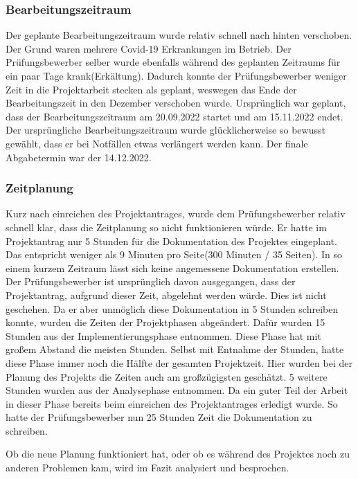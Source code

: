 \subsubsection{Bearbeitungszeitraum}
\label{sec:AbweichungenProjektantrag}
Der geplante Bearbeitungszeitraum wurde relativ schnell nach hinten verschoben. Der Grund waren mehrere Covid-19 Erkrankungen im Betrieb. Der Prüfungsbewerber selber wurde ebenfalls während des geplanten Zeitraums für ein paar Tage krank(Erkältung). Dadurch konnte der Prüfungsbewerber weniger Zeit in die Projektarbeit stecken als geplant, weswegen das Ende der Bearbeitungszeit in den Dezember verschoben wurde. Ursprünglich war geplant, dass der Bearbeitungszeitraum am 20.09.2022 startet und am 15.11.2022 endet. Der ursprüngliche Bearbeitungszeitraum wurde glücklicherweise so bewusst gewählt, dass er bei Notfällen etwas verlängert werden kann. Der finale Abgabetermin war der 14.12.2022.

\subsubsection{Zeitplanung}
\label{sec:AbweichungenProjektantrag}

Kurz nach einreichen des Projektantrages, wurde dem Prüfungsbewerber relativ schnell klar, dass die Zeitplanung so nicht funktionieren würde. Er hatte im Projektantrag nur 5 Stunden für die Dokumentation des Projektes eingeplant. Das entspricht weniger als 9 Minuten pro Seite(300 Minuten / 35 Seiten). In so einem kurzem Zeitraum lässt sich keine angemessene Dokumentation erstellen. Der Prüfungsbewerber ist ursprünglich davon ausgegangen, dass der Projektantrag, aufgrund dieser Zeit, abgelehnt werden würde. Dies ist nicht geschehen. Da er aber unmöglich diese Dokumentation in 5 Stunden schreiben konnte, wurden die Zeiten der Projektphasen abgeändert. Dafür wurden 15 Stunden aus der Implementierungsphase entnommen. Diese Phase hat mit großem Abstand die meisten Stunden. Selbst mit Entnahme der Stunden, hatte diese Phase immer noch die Hälfte der gesamten Projektzeit. Hier wurden bei der Planung des Projekts die Zeiten auch am großzügigsten geschätzt. 5 weitere Stunden wurden aus der Analysephase entnommen. Da ein guter Teil der Arbeit in dieser Phase bereits beim einreichen des Projektantrages erledigt wurde. So hatte der Prüfungsbewerber nun 25 Stunden Zeit die Dokumentation zu schreiben.

Ob die neue Planung funktioniert hat, oder ob es während des Projektes noch zu anderen Problemen kam, wird im Fazit analysiert und besprochen.

